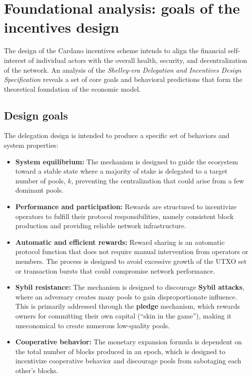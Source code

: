 \documentclass[11pt, letterpaper]{article}
\begin{document}
\section{Foundational analysis: goals of the incentives design}
The design of the Cardano incentives scheme intends to align the financial
self-interest of individual actors with the overall health, security, and
decentralization of the network. An analysis of the \textit{Shelley-era
	Delegation and Incentives Design Specification} reveals a set of core goals and
behavioral predictions that form the theoretical foundation of the economic
model.

\subsection{Design goals}
The delegation design is intended to produce a specific set of behaviors and
system properties:
\begin{itemize}
	\item \textbf{System equilibrium:} The mechanism is designed to guide the ecosystem toward a stable state
	      where a majority of stake is delegated to a target number of pools, \textbf{$k$}, preventing the
	      centralization that could arise from a few dominant pools.
	\item \textbf{Performance and participation:} Rewards are structured to incentivize operators to fulfill
	      their protocol responsibilities, namely consistent block production and providing reliable network
	      infrastructure.
	\item \textbf{Automatic and efficient rewards:} Reward sharing is an automatic protocol function that does
	      not require manual intervention from operators or members. The process is designed to avoid excessive
	      growth of the UTXO set or transaction bursts that could compromise network performance.
	\item \textbf{Sybil resistance:} The mechanism is designed to discourage \textbf{Sybil attacks}, where an
	      adversary creates many pools to gain disproportionate influence. This is primarily addressed through the
	      \textbf{pledge} mechanism, which rewards owners for committing their own capital (``skin in the game''),
	      making it uneconomical to create numerous low-quality pools.
	\item \textbf{Cooperative behavior:} The monetary expansion formula is dependent on the total number of
	      blocks produced in an epoch, which is designed to incentivize cooperative behavior and discourage pools
	      from sabotaging each other's blocks.
\end{itemize}
\end{document}
